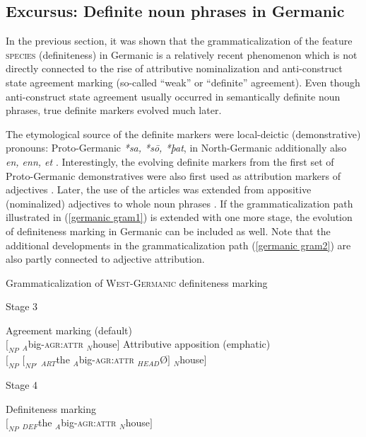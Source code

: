 {\subsection[Definite noun phrases in Germanic]{Excursus: Definite noun phrases in Germanic}
In the previous section, it was shown that the grammaticalization of the feature \textsc{species} (definiteness) in Germanic is a relatively recent phenomenon which is not directly connected to the rise of attributive nominalization and anti-construct state agreement marking (so-called “weak” or “definite” agreement). Even though anti-construct state agreement usually occurred in semantically definite noun phrases, true definite markers evolved much later.

The etymological source of the definite markers were local-deictic (demonstrative) pronouns: Proto-Germanic \textit{*sa, *sō, *þat}, in North-Germanic additionally also \textit{en, enn, et} \citep[15]{heinrichs1954}. Interestingly, the evolving definite markers from the first set of Proto-Germanic demonstratives were also first used as attribution markers of adjectives  \citep{gamillscheg1937, nocentini1996}. Later, the use of the articles was extended from appositive (nominalized) adjectives to whole noun phrases \citep[63]{philippi1997}. If the grammaticalization path illustrated in (\ref{germanic gram1}) is extended with one more stage, the evolution of definiteness marking in Germanic can be included as well. Note that the additional developments in the grammaticalization path (\ref{germanic gram2}) are also partly connected to adjective attribution.
\begin{exe}
\ex Grammaticalization of \textsc{West-Germanic} definiteness marking \label{germanic gram2}
\begin{xlist}
\ex 	Stage 3
\begin{xlist}
\ex 	Agreement marking (default)\\
$[_{NP}$ $_{A}$big-\textsc{agr:attr} $_{N}$house$]$
\ex	Attributive apposition (emphatic)\\
$[_{NP}$ $[_{NP'}$ $_{ART}$the $_{A}$big-\textsc{agr:attr} $_{HEAD}$Ø$]$ $_{N}$house$]$\label{germanic art2}
\end{xlist}
\ex 	Stage 4
\begin{xlist}
\ex	Definiteness marking\\
$[_{NP}$ $_{DEF}$the $_{A}$big-\textsc{agr:attr} $_{N}$house$]$\label{germanic def}
\end{xlist}
\end{xlist}
\end{exe}
}
